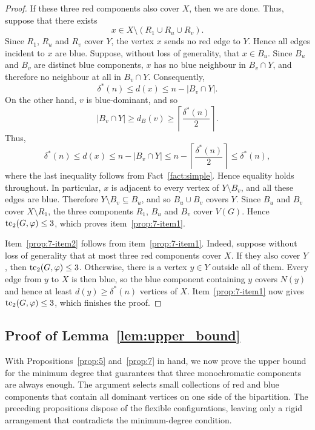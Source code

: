 \documentclass[12pt,reqno,a4paper]{amsart}
\def\tc{\mathop{\text{\rm tc}}\nolimits}
\begin{document}
\begin{proof}
If these three red components also cover $X$, then we are done. Thus, suppose
that there exists
\[
    x\in X\setminus (R_1\cup R_u\cup R_v).
\]
Since $R_1$, $R_u$ and $R_v$ cover $Y$, the vertex $x$ sends no red edge to
$Y$. Hence all edges incident to $x$ are blue. Suppose, without loss of
generality, that $x\in B_u$. Since $B_u$ and $B_v$ are distinct blue components,
$x$ has no blue neighbour in $B_v\cap Y$, and therefore no neighbour at all in
$B_v\cap Y$. Consequently,
\[
    \delta^*(n) \le d(x) \le n-|B_v\cap Y|.
\]
On the other hand, $v$ is blue-dominant, and so
\[
    |B_v\cap Y| \ge d_B(v) \ge \left\lceil \frac{\delta^*(n)}{2}\right\rceil.
\]
Thus,
\[
    \delta^*(n) \le d(x) \le n-|B_v\cap Y|
        \le n-\left\lceil \frac{\delta^*(n)}{2}\right\rceil
        \le \delta^*(n),
\]
where the last inequality follows from Fact~\ref{fact:simple}. Hence equality
holds throughout. In particular, $x$ is adjacent to every vertex of $Y\setminus
B_v$, and all these edges are blue. Therefore $Y\setminus B_v\subseteq B_u$, and
so $B_u\cup B_v$ covers $Y$. Since $B_u$ and $B_v$ cover $X\setminus R_1$, the
three components $R_1$, $B_u$ and $B_v$ cover $V(G)$. Hence $\tc_2(G,\varphi)\le
3$, which proves item~\ref{prop:7-item1}.

Item~\ref{prop:7-item2} follows from item~\ref{prop:7-item1}. Indeed, suppose
without loss of generality that at most three red components cover
$X$. If they also cover $Y$, then $\tc_2(G,\varphi)\le 3$. Otherwise, there is a vertex
$y\in Y$ outside all of them. Every edge from $y$ to $X$ is then blue, so the
blue component containing $y$ covers $N(y)$ and hence at least
$d(y)\ge \delta^*(n)$ vertices of $X$. Item~\ref{prop:7-item1} now gives
$\tc_2(G,\varphi)\le 3$, which finishes the proof.
\end{proof}


\subsection{Proof of Lemma~\ref{lem:upper_bound}}

With Propositions~\ref{prop:5} and~\ref{prop:7} in hand, we now prove the upper
bound for the minimum degree that guarantees that three monochromatic components
are always enough. The argument selects small collections of red and blue
components that contain all dominant vertices on one side of the bipartition.
The preceding propositions dispose of the flexible configurations, leaving only
a rigid arrangement that contradicts the minimum-degree condition.
\end{document}

